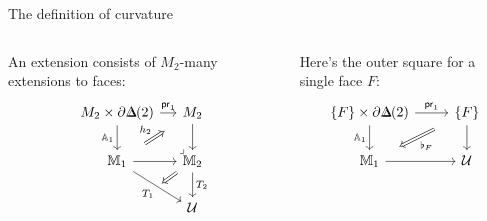 \begin{frame}{The definition of curvature}
\begin{mydef}[cont.]
\begin{columns}[t]
\begin{column}{0.55\textwidth}
An extension consists of \( M_2 \)-many extensions to faces:
\[\begin{tikzcd}[ampersand replacement=\&, column sep=small]
  {M_2\times \partial\Dd(2)} \& {M_2} \\
  {\mathbb{M}_{1}} \& {\mathbb{M}_2} \\
  \& {\mathcal{U}}
  \arrow["{\mathrm{pr}_1}", from=1-1, to=1-2]
  \arrow["{\mathbb{A}_{1}}"', from=1-1, to=2-1]
  \arrow["{}", from=1-2, to=2-2]
  \arrow["{h_2}", shorten <=10pt, shorten >=10pt, Rightarrow, from=2-1, to=1-2]
  \arrow["{}", from=2-1, to=2-2]
  \arrow[""{name=0, anchor=center, inner sep=0}, "{T_{1}}"', from=2-1, to=3-2]
  \arrow["\ulcorner"{pos=-0.05, rotate=180}, shift left=1.5, draw=none, from=2-2, to=1-1]
  \arrow["{T_2}", from=2-2, to=3-2]
  \arrow["{}", shorten >=3pt, Rightarrow, from=2-2, to=0]
\end{tikzcd}\]
\end{column}
\begin{column}{0.45\textwidth}
Here's the outer square for a single face \( F \):
\[\begin{tikzcd}[ampersand replacement=\&]
  {\{F\}\times \partial\Dd(2)} \& \{F\} \\
  {\mathbb{M}_{1}} \& {\mathcal{U}}
  \arrow["{\pr_1}", from=1-1, to=1-2]
  \arrow["{\mathbb{A}_{1}}"', from=1-1, to=2-1]
  \arrow["{}", from=1-2, to=2-2]
  \arrow["{\flat_F}", shorten <=11pt, shorten >=11pt, Rightarrow, from=1-2, to=2-1]
  \arrow[from=2-1, to=2-2]
\end{tikzcd}\]
\end{column}
\end{columns}

\end{mydef}
\end{frame}

% 

